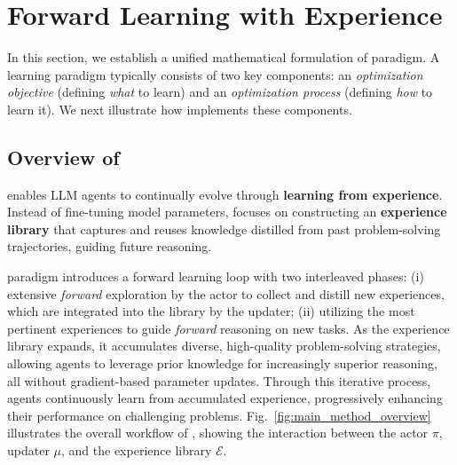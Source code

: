 \section{Forward Learning with Experience}
In this section, we establish a unified mathematical formulation of \method{} paradigm. 
A learning paradigm typically consists of two key components: an \emph{optimization objective} (defining \textit{what} to learn) and an \emph{optimization process} (defining \textit{how} to learn it). We next illustrate how \method{} implements these components.


\subsection{Overview of \method{}}
\method{} enables LLM agents to continually evolve through \textbf{learning from experience}. 
Instead of fine-tuning model parameters, \method{} focuses on constructing an \textbf{experience library} that captures and reuses knowledge distilled from past problem-solving trajectories, guiding future reasoning.

\method{} paradigm introduces a forward learning loop with two interleaved phases:
(i) extensive \textit{forward} exploration by the actor to collect and distill new experiences, which are integrated into the library by the updater; 
(ii) utilizing the most pertinent experiences to guide \textit{forward} reasoning on new tasks. 
As the experience library expands, it accumulates diverse, high-quality problem-solving strategies, allowing agents to leverage prior knowledge for increasingly superior reasoning, all without gradient-based parameter updates. 
Through this iterative process, agents continuously learn from accumulated experience, progressively enhancing their performance on challenging problems.
Fig.~\ref{fig:main_method_overview} illustrates the overall workflow of \method{}, showing the interaction between the actor $\pi$, updater $\mu$, and the experience library $\mathcal{E}$.

